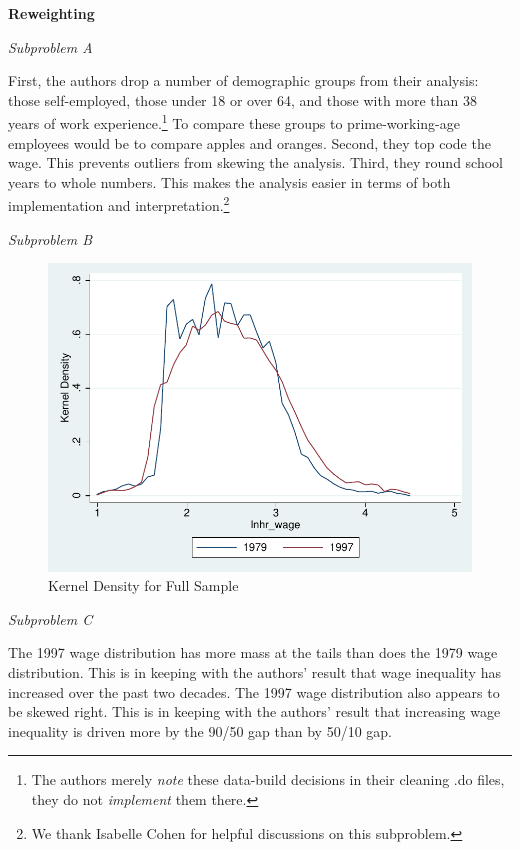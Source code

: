 \documentclass[11pt]{article}
\begin{document}
\begin{center}
\end{center}

\bigskip \textbf{Reweighting}

\bigskip \textit{Subproblem A}

\bigskip First, the authors drop a number of demographic groups from their analysis: those self-employed, those under 18 or over 64, and those with more than 38 years of work experience.\footnote{The authors merely \textit{note} these data-build decisions in their cleaning .do files, they do not \textit{implement} them there.} To compare these groups to prime-working-age employees would be to compare apples and oranges. Second, they top code the wage. This prevents outliers from skewing the analysis. Third, they round school years to whole numbers. This makes the analysis easier in terms of both implementation and interpretation.\footnote{We thank Isabelle Cohen for helpful discussions on this subproblem.}

\bigskip \textit{Subproblem B}

\begin{figure}[H]
	\caption{Kernel Density for Full Sample}
	\centering
	\includegraphics[width=.75\textwidth]{Kernel_Density_Full.pdf}
\end{figure}

\textit{Subproblem C}

\bigskip The 1997 wage distribution has more mass at the tails than does the 1979 wage distribution. This is in keeping with the authors' result that wage inequality has increased over the past two decades. The 1997 wage distribution also appears to be skewed right. This is in keeping with the authors' result that increasing wage inequality is driven more by the 90/50 gap than by 50/10 gap.
\end{document}
